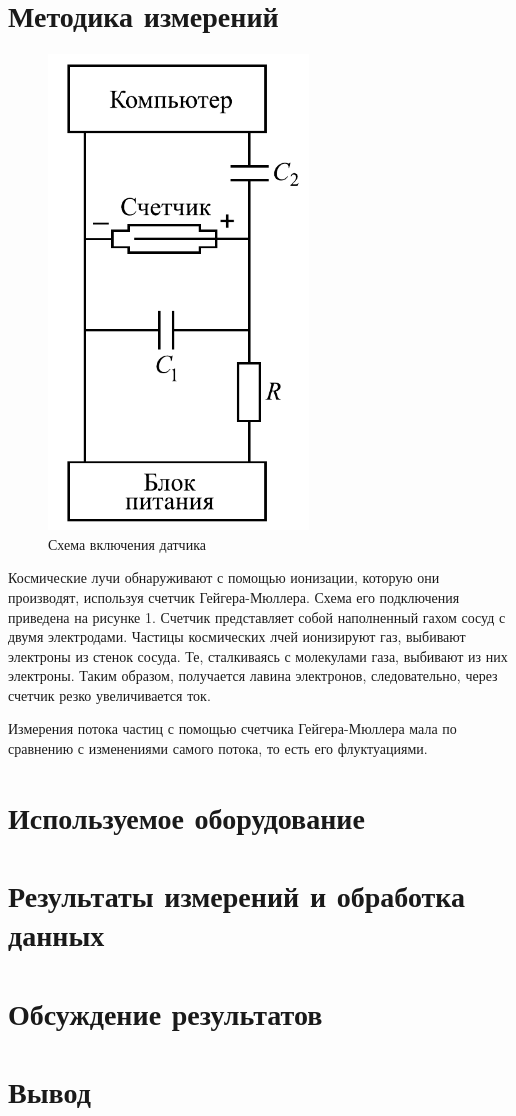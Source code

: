 \documentclass[a4paper, 12pt]{article}
\begin{document}
 	\section{Методика измерений}
	\begin{figure}[H]
		\centering
		\includegraphics[scale = 0.5]{pictures/scheme.png}
		\caption{Схема включения датчика}
	\end{figure}
	
	Космические лучи обнаруживают с помощью ионизации, которую они производят, используя счетчик Гейгера-Мюллера. Схема его подключения приведена на рисунке 1. Счетчик представляет собой наполненный гахом сосуд с двумя электродами. Частицы космических лчей ионизируют газ, выбивают электроны из стенок сосуда. Те, сталкиваясь с молекулами газа, выбивают из них электроны. Таким образом, получается лавина электронов, следовательно, через счетчик резко увеличивается ток.


Измерения потока частиц с помощью счетчика Гейгера-Мюллера мала по сравнению с изменениями самого потока, то есть его флуктуациями.
	\section{Используемое оборудование}

	\section{Результаты измерений и обработка данных}
	\section{Обсуждение результатов}
	\section{Вывод}
\end{document}
